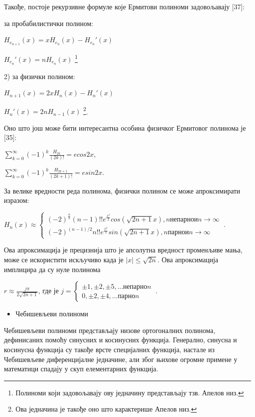 Такође, постоје рекурзивне формуле које Ермитови полиноми задовољавају
{[}37{]}:

за пробабилистички полином:

\(H_{e_{n + 1}}(x) = xH_{e_{n}}(x) - H_{e_{n}}'(x)\)

\(H_{e_{n}}'(x) = nH_{e_{n}}(x)\) \footnote{Полиноми који задовољавају
  ову једначину представљају тзв. Апелов низ.}

2) за физички полином:

\(H_{n + 1}(x) = 2xH_{n}(x) - H_{n}'(x)\)

\(H_{n}'(x) = 2nH_{n - 1}(x)\) \footnote{Ова једначина је такође оно што
  карактерише Апелов низ.}.

Оно што још може бити интересантна особина физичког Ермитовог полинома
је {[}35{]}:

\(\sum_{k = 0}^{\infty}{( - 1)}^{k}\frac{H_{2k}}{(2k)!} = ecos2x\),

\(\sum_{k = 0}^{\infty}{( - 1)}^{k}\frac{H_{2k + 1}}{(2k + 1)!} = esin2x\).

За велике вредности реда полинома, физички полином се може апроксимирати
изразом:

\(H_{n}(x) \approx \left\{ \begin{array}{r}
{( - 2)}^{\frac{n}{2}}(n - 1)!!e^{\frac{x^{2}}{2}}cos(\sqrt{2n + 1}x),nнепарноиn \rightarrow \infty \\
{( - 2)}^{(n - 1)/2}n!!e^{\frac{x^{2}}{2}}sin(\sqrt{2n + 1}x),nпарноиn \rightarrow \infty
\end{array} \right.\ \).

Ова апроксимација је прецизнија што је апсолутна вредност променљиве
мања, може се искористити искључиво када је \(|x| \leqslant \sqrt{2n}\).
Ова апроксимација имплицира да су нуле полинома

\(r \approx \frac{j\pi}{2\sqrt{2n + 1}}\), где је
\(j = \left\{ \begin{array}{r}
 \pm 1, \pm 2, \pm 5,...непарноn \\
0, \pm 2, \pm 4,...парноn
\end{array} \right.\ \).

\begin{itemize}
\item
  Чебишевљеви полиноми
\end{itemize}

Чебишевљеви полиноми представљају низове ортогоналних полинома,
дефинисаних помоћу синусних и косинусних функција. Генерално, синусна и
косинусна функција су такође врсте специјалних функција, настале из
Чебишевљеве диференцијалне једначине, али због њихове огромне примене у
математици спадају у скуп елементарних функција.

